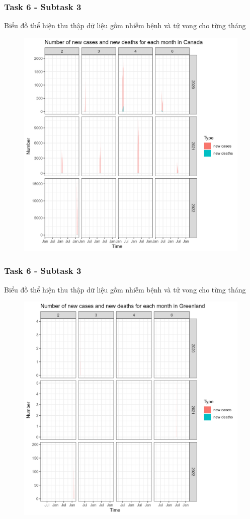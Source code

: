 \documentclass[english,10pt,table]{beamer}
\begin{document}
\frame
{
    \frametitle{Task 6 - Subtask 3}
    \begin{block}{Biểu đồ thể hiện thu thập dữ liệu gồm nhiễm bệnh và tử vong cho từng tháng}
    \begin{figure}[H]
		\centering
		\includegraphics[scale=0.105]{images/6.3.1.png}
	\end{figure}
    \end{block}
}
\frame
{
    \frametitle{Task 6 - Subtask 3}
    \begin{block}{Biểu đồ thể hiện thu thập dữ liệu gồm nhiễm bệnh và tử vong cho từng tháng}
    \begin{figure}[H]
		\centering
		\includegraphics[scale=0.105]{images/6.3.2.png}
	\end{figure}
    \end{block}
}
\end{document}

